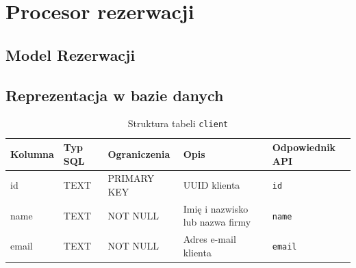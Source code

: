 \documentclass[11pt]{article}
\begin{document}
\newpage

\section{Procesor rezerwacji}

\subsection{Model Rezerwacji}



\subsection{Reprezentacja w bazie danych}
\begin{table}[H]
  \centering
  \renewcommand{\arraystretch}{1.3}
  \begin{tabularx}{\textwidth}{|l|l|l|X|l|}
    \hline
    \textbf{Kolumna} & \textbf{Typ SQL} & \textbf{Ograniczenia} & \textbf{Opis} & \textbf{Odpowiednik API} \\
    \hline
    id & TEXT & PRIMARY KEY & UUID klienta & \texttt{id} \\
    \hline
    name & TEXT & NOT NULL & Imię i nazwisko lub nazwa firmy & \texttt{name} \\
    \hline
    email & TEXT & NOT NULL & Adres e-mail klienta & \texttt{email} \\
    \hline
  \end{tabularx}
  \caption{Struktura tabeli \texttt{client}}
  \label{tab:schema-client}
\end{table}
\end{document}
